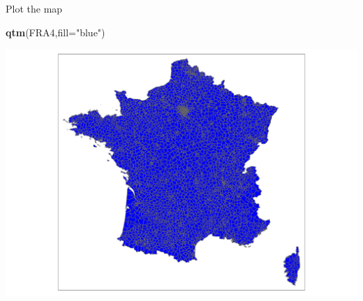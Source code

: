 \documentclass[
  ignorenonframetext,
]{beamer}
\newenvironment{Shaded}{\begin{snugshade}}{\end{snugshade}}
\newcommand{\DataTypeTok}[1]{\textcolor[rgb]{0.13,0.29,0.53}{#1}}
\newcommand{\KeywordTok}[1]{\textcolor[rgb]{0.13,0.29,0.53}{\textbf{#1}}}
\newcommand{\NormalTok}[1]{#1}
\newcommand{\StringTok}[1]{\textcolor[rgb]{0.31,0.60,0.02}{#1}}
\begin{document}
\begin{frame}[fragile]{Plot the map}
\protect\hypertarget{plot-the-map}{}
\begin{Shaded}
\begin{Highlighting}[]
\KeywordTok{qtm}\NormalTok{(FRA4,}\DataTypeTok{fill=}\StringTok{"blue"}\NormalTok{)}
\end{Highlighting}
\end{Shaded}

\includegraphics{quick_high_quality_maps_files/figure-beamer/unnamed-chunk-20-1.pdf}
\end{frame}
\end{document}
